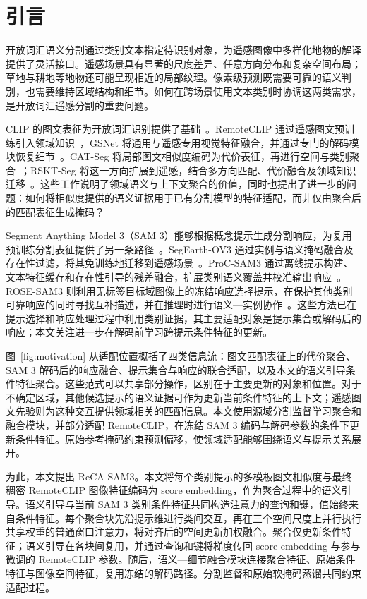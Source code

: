 \section{引言}
开放词汇语义分割通过类别文本指定待识别对象，为遥感图像中多样化地物的解译提供了灵活接口。遥感场景具有显著的尺度差异、任意方向分布和复杂空间布局；草地与耕地等地物还可能呈现相近的局部纹理。像素级预测既需要可靠的语义判别，也需要维持区域结构和细节。如何在跨场景使用文本类别时协调这两类需求，是开放词汇遥感分割的重要问题。

CLIP 的图文表征为开放词汇识别提供了基础~\cite{radfordLearningTransferableVisual2021}。RemoteCLIP 通过遥感图文预训练引入领域知识~\cite{liuRemoteCLIPVisionLanguage2024}，GSNet 将通用与遥感专用视觉特征融合，并通过专门的解码模块恢复细节~\cite{yeOpenVocabularyRemoteSensing2025}。CAT-Seg 将局部图文相似度编码为代价表征，再进行空间与类别聚合~\cite{choCATSegCostAggregation2024}；RSKT-Seg 将这一方向扩展到遥感，结合多方向匹配、代价融合及领域知识迁移~\cite{liExploringEfficientOpenVocabulary2026}。这些工作说明了领域语义与上下文聚合的价值，同时也提出了进一步的问题：如何将相似度提供的语义证据用于已有分割模型的特征适配，而非仅由聚合后的匹配表征生成掩码？

Segment Anything Model 3（SAM 3）能够根据概念提示生成分割响应，为复用预训练分割表征提供了另一条路径~\cite{carionSAM3Segment2026}。SegEarth-OV3 通过实例与语义掩码融合及存在性过滤，将其免训练地迁移到遥感场景~\cite{liSegEarthOV3ExploringSAM2026}。ProC-SAM3 通过离线提示构建、文本特征缓存和存在性引导的残差融合，扩展类别语义覆盖并校准输出响应~\cite{songPromptCalibratedSAM32026}。ROSE-SAM3 则利用无标签目标域图像上的冻结响应选择提示，在保护其他类别可靠响应的同时寻找互补描述，并在推理时进行语义—实例协作~\cite{songROSESAM3ResponseOrientedPrompt2026}。这些方法已在提示选择和响应处理过程中利用类别证据，其主要适配对象是提示集合或解码后的响应；本文关注进一步在解码前学习跨提示条件特征的更新。

图~\ref{fig:motivation} 从适配位置概括了四类信息流：图文匹配表征上的代价聚合、SAM 3 解码后的响应融合、提示集合与响应的联合适配，以及本文的语义引导条件特征聚合。这些范式可以共享部分操作，区别在于主要更新的对象和位置。对于不确定区域，其他候选提示的语义证据可作为更新当前条件特征的上下文；遥感图文先验则为这种交互提供领域相关的匹配信息。本文使用源域分割监督学习聚合和融合模块，并部分适配 RemoteCLIP，在冻结 SAM 3 编码与解码参数的条件下更新条件特征。原始参考掩码约束预测偏移，使领域适配能够围绕语义与提示关系展开。



为此，本文提出 ReCA-SAM3。本文将每个类别提示的多模板图文相似度与最终稠密 RemoteCLIP 图像特征编码为 score embedding，作为聚合过程中的语义引导。语义引导与当前 SAM 3 类别条件特征共同构造注意力的查询和键，值始终来自条件特征。每个聚合块先沿提示维进行类间交互，再在三个空间尺度上并行执行共享权重的普通窗口注意力，将对齐后的空间更新加权融合。聚合仅更新条件特征；语义引导在各块间复用，并通过查询和键将梯度传回 score embedding 与参与微调的 RemoteCLIP 参数。随后，语义—细节融合模块连接聚合特征、原始条件特征与图像空间特征，复用冻结的解码路径。分割监督和原始软掩码蒸馏共同约束适配过程。

